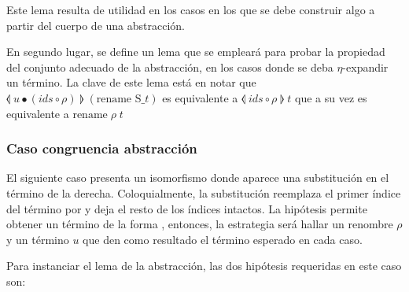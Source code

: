 \documentclass[]{report}
\begin{document}
	
	Este lema resulta de utilidad en los casos en los que se debe construir algo a partir del cuerpo de una abstracción.
	
	
	En segundo lugar, se define un lema que se empleará para probar la propiedad del conjunto adecuado de la abstracción, en los casos donde se deba $\eta$-expandir un término.
	La clave de este lema está en notar que $\llangle\; u \bullet (ids \circ \rho) \;\rrangle\;(\text{rename S\_ } t)$ es equivalente a $\llangle\; ids \circ \rho \;\rrangle\; t$ que a su vez es equivalente a $\text{rename}\;\rho\; t$
	
	
	
	\subsubsection{Caso congruencia abstracción}
	
	El siguiente caso presenta un isomorfismo donde aparece una substitución en el término de la derecha.
	Coloquialmente, la substitución  reemplaza el primer índice del término por
	\AgdaOperator{\AgdaInductiveConstructor{[}}\AgdaSpace{}%
	\AgdaSpace{}%
	\AgdaOperator{\AgdaInductiveConstructor{]≡}}\AgdaSpace{}%
	\AgdaSymbol{(}\AgdaSpace{}%
	\AgdaSymbol{)}
	y deja el resto de los índices intactos.
	La hipótesis  permite obtener un término de la forma
	\snstar
	\AgdaSymbol{(}\AgdaSpace{}%
	\AgdaSpace{}%
	\AgdaSpace{}%
	\AgdaSymbol{(}\AgdaSpace{}%
	\AgdaSpace{}%
	\AgdaSymbol{)}\AgdaSpace{}%
	\AgdaSpace{}%
	\AgdaSymbol{)}
	, entonces, la estrategia será hallar un renombre $\rho$ y un término $u$ que den como resultado el término esperado en cada caso.
	
	Para instanciar el lema de la abstracción, las dos hipótesis requeridas en este caso son:
	
\end{document}
